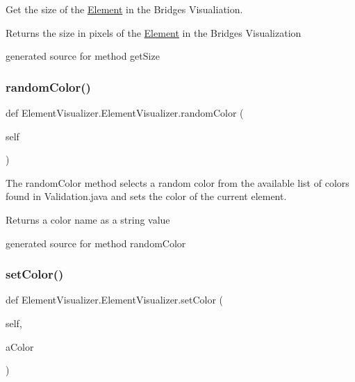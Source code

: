 Get the size of the \hyperlink{namespace_element}{Element} in the Bridges Visualiation. 

\begin{DoxyReturn}{Returns}
the size in pixels of the \hyperlink{namespace_element}{Element} in the Bridges Visualization\begin{DoxyVerb}generated source for method getSize \end{DoxyVerb}
 
\end{DoxyReturn}
\hypertarget{class_element_visualizer_1_1_element_visualizer_ad128c758217718b95114a033e33824cf}{}\label{class_element_visualizer_1_1_element_visualizer_ad128c758217718b95114a033e33824cf} 
\subsubsection{\texorpdfstring{random\+Color()}{randomColor()}}
{\footnotesize\ttfamily def Element\+Visualizer.\+Element\+Visualizer.\+random\+Color (\begin{DoxyParamCaption}\item[{}]{self }\end{DoxyParamCaption})}



The random\+Color method selects a random color from the available list of colors found in Validation.\+java and sets the color of the current element. 

\begin{DoxyReturn}{Returns}
a color name as a string value\begin{DoxyVerb}generated source for method randomColor \end{DoxyVerb}
 
\end{DoxyReturn}
\hypertarget{class_element_visualizer_1_1_element_visualizer_a90429883a7814ab9571c1b5a0baa9e4e}{}\label{class_element_visualizer_1_1_element_visualizer_a90429883a7814ab9571c1b5a0baa9e4e} 
\subsubsection{\texorpdfstring{set\+Color()}{setColor()}}
{\footnotesize\ttfamily def Element\+Visualizer.\+Element\+Visualizer.\+set\+Color (\begin{DoxyParamCaption}\item[{}]{self,  }\item[{}]{a\+Color }\end{DoxyParamCaption})}



